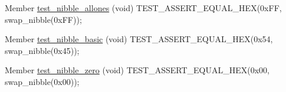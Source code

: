 
\begin{DoxyRefList}
\item[Member \mbox{\hyperlink{test__p_8c_aaa205e9402aebe56a50dc6943b7ba0d7}{test\+\_\+nibble\+\_\+allones}} (void)]\label{test__test000003}%
%
TEST\+\_\+\+ASSERT\+\_\+\+EQUAL\+\_\+\+HEX(0x\+FF, swap\+\_\+nibble(0x\+FF));  
\item[Member \mbox{\hyperlink{test__p_8c_a6c0bbbef1217eec4701b2137244de760}{test\+\_\+nibble\+\_\+basic}} (void)]\label{test__test000002}%
%
TEST\+\_\+\+ASSERT\+\_\+\+EQUAL\+\_\+\+HEX(0x54, swap\+\_\+nibble(0x45));  
\item[Member \mbox{\hyperlink{test__p_8c_a1d866c6377e75832838f5a0e388c9520}{test\+\_\+nibble\+\_\+zero}} (void)]\label{test__test000001}%
%
TEST\+\_\+\+ASSERT\+\_\+\+EQUAL\+\_\+\+HEX(0x00, swap\+\_\+nibble(0x00)); 
\end{DoxyRefList}